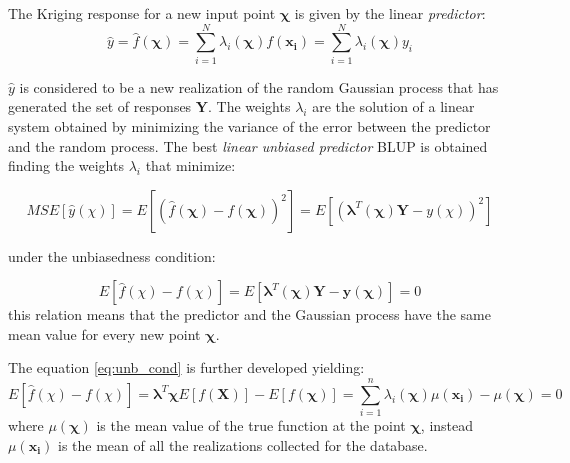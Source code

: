 The Kriging response for a new input point $\boldsymbol{\chi}$ is given by the linear \textit{predictor}:
\begin{equation}
\hat{y} = \hat{f}(\boldsymbol{\chi}) = \sum_{i=1}^{N} \lambda_i(\boldsymbol{\chi}) f(\mathbf{x_i}) =  \sum_{i=1}^{N} \lambda_i(\boldsymbol{\chi}) y_i
\end{equation}

$\hat{y}$ is considered to be a new realization of the random Gaussian process that has generated the set of responses $\mathbf{Y}$.
The weights $\lambda_i$ are the solution of a linear system obtained by minimizing the variance of the error between the predictor and the random process.
The best \textit{linear unbiased predictor} BLUP is obtained finding the weights $\lambda_i$ that minimize:

\begin{equation}
MSE[\hat{y}(\chi)] =  E \left[\left( \hat{f}(\boldsymbol{\chi})  -f(\boldsymbol{\chi}) \right)^2\right] = E \left[\left(   \boldsymbol{\lambda}^T(\boldsymbol{\chi})\mathbf{Y} -y(\chi)\right)^2\right]
\label{eq:var_err}
\end{equation}

under the unbiasedness condition:

\begin{equation}
E \left[ \hat{f}(\chi)  -f(\chi)\right] =  E \left[ \boldsymbol{\lambda}^T(\boldsymbol{\chi})\mathbf{Y} -\mathbf{y}(\boldsymbol{\chi})  \right] = 0
\label{eq:unb_cond}
\end{equation}
this relation means that the predictor and the Gaussian process have the same mean value for every new point $\boldsymbol{\chi}$.

The equation \eqref{eq:unb_cond} is further developed yielding:
\begin{equation}
E \left[ \hat{f}(\chi)  -f(\chi)\right] = \boldsymbol{\lambda}^T \boldsymbol{\chi} E \left[ f(\mathbf{X})  \right] - E \left[ f(\boldsymbol{\chi})  \right] = \sum_{i=1}^{n} \lambda_i(\boldsymbol{\chi}) \mu(\mathbf{x_i}) - \mu(\boldsymbol{\chi}) = 0
\label{eq:unb_cond2}
\end{equation}
where $\mu(\boldsymbol{\chi})$ is the mean value of the true function at the point $\boldsymbol{\chi}$, instead $\mu(\mathbf{x_i})$ is the mean of all the realizations collected for the database.


